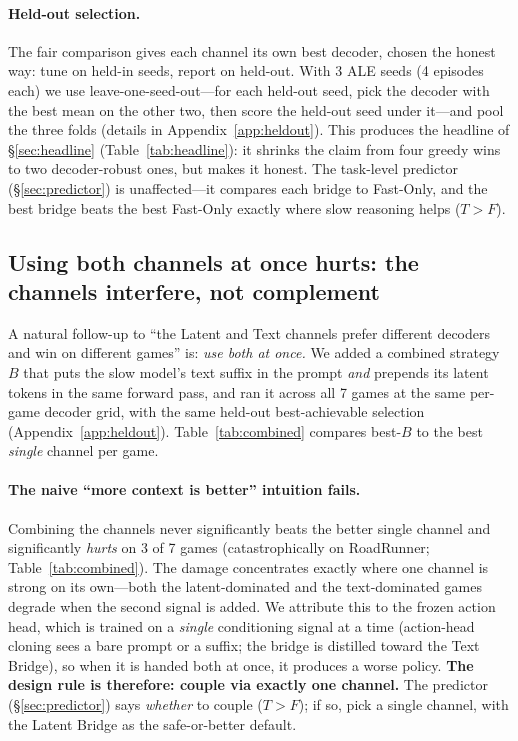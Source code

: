 \documentclass[11pt]{article}
\begin{document}
\paragraph{Held-out selection.} The fair comparison gives each channel its own best decoder, chosen
the honest way: tune on held-in seeds, report on held-out. With 3 ALE seeds (4 episodes each) we use
leave-one-seed-out---for each held-out seed, pick the decoder with the best mean on the other two,
then score the held-out seed under it---and pool the three folds (details in
Appendix~\ref{app:heldout}). This produces the headline of \S\ref{sec:headline}
(Table~\ref{tab:headline}): it shrinks the claim from four greedy wins to two decoder-robust ones,
but makes it honest. The task-level predictor (\S\ref{sec:predictor}) is unaffected---it compares
each bridge to Fast-Only, and the best bridge beats the best Fast-Only exactly where slow reasoning
helps ($T\!>\!F$).

\subsection{Using both channels at once hurts: the channels interfere, not complement}
\label{sec:combined}

A natural follow-up to ``the Latent and Text channels prefer different decoders and win on different
games'' is: \emph{use both at once.} We added a combined strategy $B$ that puts the slow model's text
suffix in the prompt \emph{and} prepends its latent tokens in the same forward pass, and ran it across
all 7 games at the same per-game decoder grid, with the same held-out best-achievable selection
(Appendix~\ref{app:heldout}). Table~\ref{tab:combined} compares best-$B$ to the best \emph{single}
channel per game.

\begin{table}[h]
\centering\small

\caption{\textbf{Combining both channels (best $B$) vs.\ the best single channel}, held-out
best-achievable, $n\!=\!12$. $\Delta_{B-\text{single}}$ is $(B-\text{best single})/\text{best single}$.}
\label{tab:combined}
\end{table}

\paragraph{The naive ``more context is better'' intuition fails.} Combining the channels never
significantly beats the better single channel and significantly \emph{hurts} on 3 of 7 games
(catastrophically on RoadRunner; Table~\ref{tab:combined}). The damage concentrates exactly where
one channel is strong on its own---both the latent-dominated and the text-dominated games degrade
when the second signal is added. We attribute this to the frozen action head, which is trained on a
\emph{single} conditioning signal at a time (action-head cloning sees a bare prompt or a suffix; the bridge
is distilled toward the Text Bridge), so when it is handed both at once, it produces a worse policy.
\textbf{The design rule is therefore: couple via exactly one channel.} The predictor
(\S\ref{sec:predictor}) says \emph{whether} to couple ($T\!>\!F$); if so, pick a single channel,
with the Latent Bridge as the safe-or-better default.
\end{document}
